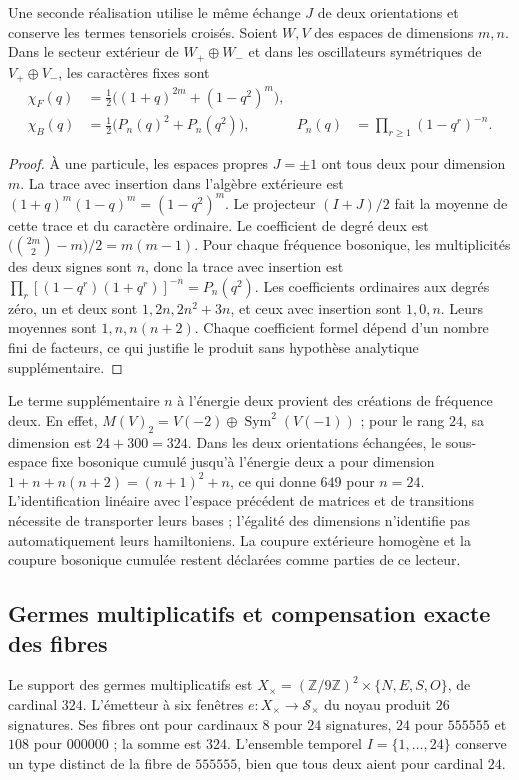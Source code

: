 Une seconde réalisation utilise le même échange $J$ de deux
orientations et conserve les termes tensoriels croisés. Soient $W,V$
des espaces de dimensions $m,n$. Dans le secteur extérieur de $W_+\oplus W_-$
et dans les oscillateurs symétriques de $V_+\oplus V_-$, les caractères fixes sont
\begin{align}
 \chi_F(q)&=\tfrac12\bigl((1+q)^{2m}+(1-q^2)^m\bigr),\\
 \chi_B(q)&=\tfrac12\bigl(P_n(q)^2+P_n(q^2)\bigr),
 &P_n(q)&=\prod_{r\geq1}(1-q^r)^{-n}.
 \label{eq:ii-ter27-caracteres}
\end{align}
\begin{proof}
À une particule, les espaces propres $J=\pm1$ ont tous deux pour dimension $m$.
La trace avec insertion dans l’algèbre extérieure est
$(1+q)^m(1-q)^m=(1-q^2)^m$. Le projecteur $(I+J)/2$ fait la moyenne de cette trace
et du caractère ordinaire. Le coefficient de degré deux est
$\bigl(\binom{2m}{2}-m\bigr)/2=m(m-1)$.
Pour chaque fréquence bosonique, les multiplicités des deux signes sont
$n$, donc la trace avec insertion est
$\prod_r[(1-q^r)(1+q^r)]^{-n}=P_n(q^2)$.
Les coefficients ordinaires aux degrés zéro, un et deux sont
$1,2n,2n^2+3n$, et ceux avec insertion sont $1,0,n$. Leurs moyennes sont
$1,n,n(n+2)$. Chaque coefficient formel dépend d’un nombre fini de
facteurs, ce qui justifie le produit sans hypothèse analytique supplémentaire.
\end{proof}
Le terme supplémentaire $n$ à l’énergie deux provient des créations de
fréquence deux. En effet,
$M(V)_2=V(-2)\oplus\operatorname{Sym}^2(V(-1))$ ; pour le rang $24$,
sa dimension est $24+300=324$. Dans les deux orientations échangées,
le sous-espace fixe bosonique cumulé jusqu’à l’énergie deux a pour dimension
$1+n+n(n+2)=(n+1)^2+n$, ce qui donne $649$ pour $n=24$.
L’identification linéaire avec l’espace précédent de matrices et de transitions
nécessite de transporter leurs bases ; l’égalité des dimensions n’identifie pas
automatiquement leurs hamiltoniens. La coupure extérieure homogène et la coupure
bosonique cumulée restent déclarées comme parties de ce lecteur.

\subsection{Germes multiplicatifs et compensation exacte des fibres}
\label{sec:ii-ter27-fibras}

Le support des germes multiplicatifs est
$X_\times=(\mathbb Z/9\mathbb Z)^2\times\{N,E,S,O\}$, de cardinal
$324$. L’émetteur à six fenêtres $e:X_\times\to\mathcal S_\times$
du noyau produit $26$ signatures. Ses fibres ont pour cardinaux $8$ pour
$24$ signatures, $24$ pour $555555$ et $108$ pour $000000$ ; la somme est $324$.
L’ensemble temporel $I=\{1,\ldots,24\}$ conserve un type distinct de la
fibre de $555555$, bien que tous deux aient pour cardinal $24$.

